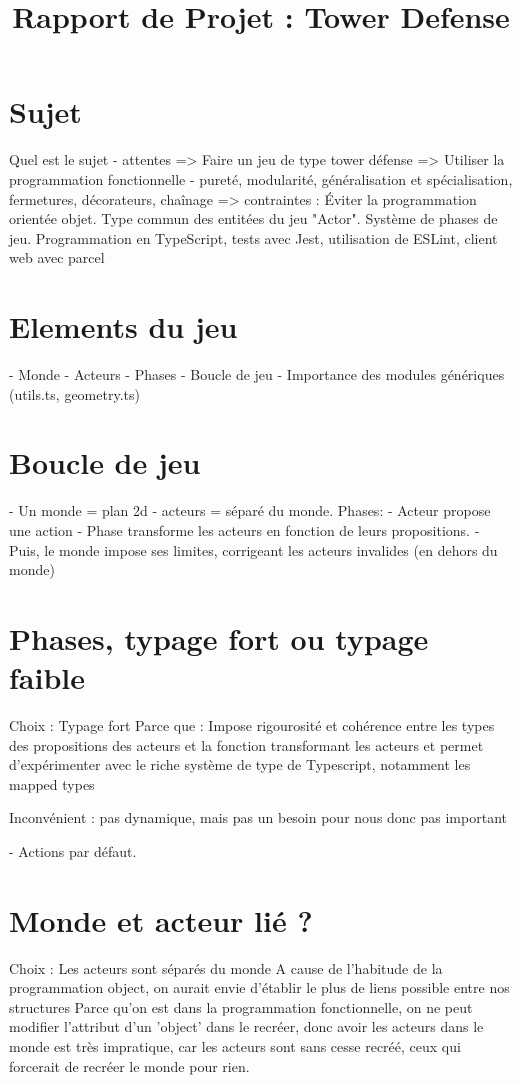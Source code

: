 \documentclass{article}
\title{Rapport de Projet : Tower Defense}
\begin{document}
\maketitle

\section{Sujet}
Quel est le sujet
- attentes
 => Faire un jeu de type tower défense
 => Utiliser la programmation fonctionnelle
    - pureté, modularité, généralisation et spécialisation, fermetures, décorateurs, chaînage
 => contraintes :
    Éviter la programmation orientée objet.
    Type commun des entitées du jeu "Actor".
    Système de phases de jeu.
    Programmation en TypeScript, tests avec Jest, utilisation de ESLint, client web avec parcel

\section{Elements du jeu}
- Monde
- Acteurs
- Phases
- Boucle de jeu
- Importance des modules génériques (utils.ts, geometry.ts)

\section{Boucle de jeu}
- Un monde = plan 2d
- acteurs = séparé du monde.
Phases:
 - Acteur propose une action
 - Phase transforme les acteurs en fonction de leurs propositions.
 - Puis, le monde impose ses limites, corrigeant les acteurs invalides (en dehors du monde)


\section{Phases, typage fort ou typage faible}
Choix : Typage fort
Parce que : Impose rigourosité et cohérence entre les types des propositions des 
acteurs et la fonction transformant les acteurs et permet d'expérimenter avec 
le riche système de type de Typescript, notamment les mapped types

Inconvénient : pas dynamique, mais pas un besoin pour nous donc pas important

- Actions par défaut.

\section{Monde et acteur lié ?}
Choix : Les acteurs sont séparés du monde
A cause de l'habitude de la programmation object, on aurait envie d'établir le plus de liens possible entre nos structures
Parce qu'on est dans la programmation fonctionnelle, on ne peut modifier l'attribut d'un 'object' dans le recréer, 
donc avoir les acteurs dans le monde est très impratique, car les acteurs sont sans cesse recréé, ceux qui forcerait de 
recréer le monde pour rien.
\end{document}
